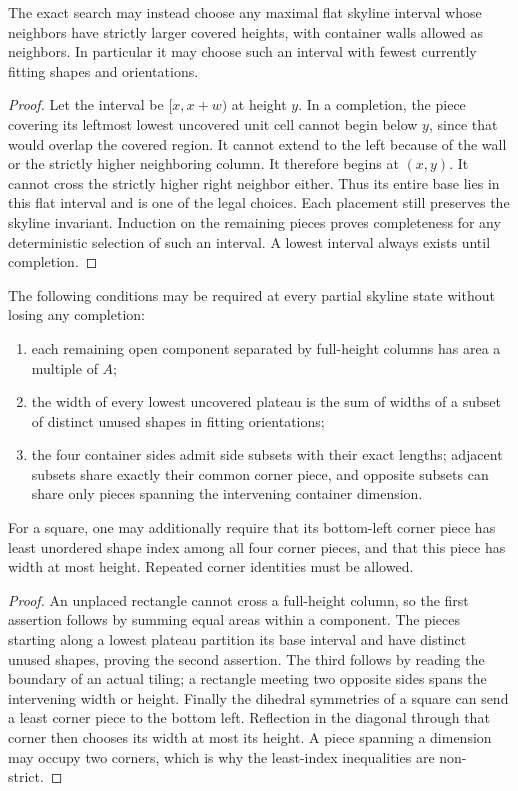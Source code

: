 \documentclass[11pt]{article}
\begin{document}
\begin{lemma}\label{valley}
The exact search may instead choose any maximal flat skyline interval whose
neighbors have strictly larger covered heights, with container walls allowed
as neighbors. In particular it may choose such an interval with fewest
currently fitting shapes and orientations.
\end{lemma}
\begin{proof}
Let the interval be $[x,x+w)$ at height $y$. In a completion, the piece
covering its leftmost lowest uncovered unit cell cannot begin below $y$,
since that would overlap the covered region. It cannot extend to the left
because of the wall or the strictly higher neighboring column. It therefore
begins at $(x,y)$. It cannot cross the strictly higher right neighbor either.
Thus its entire base lies in this flat interval and is one of the legal
choices. Each placement still preserves the skyline invariant. Induction on
the remaining pieces proves completeness for any deterministic selection of
such an interval. A lowest interval always exists until completion.
\end{proof}

\begin{proposition}\label{pruning}
The following conditions may be required at every partial skyline state without
losing any completion:
\begin{enumerate}
\item each remaining open component separated by full-height columns has area
a multiple of $A$;
\item the width of every lowest uncovered plateau is the sum of widths of a
subset of distinct unused shapes in fitting orientations;
\item the four container sides admit side subsets with their exact lengths;
adjacent subsets share exactly their common corner piece, and opposite subsets
can share only pieces spanning the intervening container dimension.
\end{enumerate}
For a square, one may additionally require that its bottom-left corner piece
has least unordered shape index among all four corner pieces, and that this
piece has width at most height. Repeated corner identities must be allowed.
\end{proposition}
\begin{proof}
An unplaced rectangle cannot cross a full-height column, so the first assertion
follows by summing equal areas within a component. The pieces starting along a
lowest plateau partition its base interval and have distinct unused shapes,
proving the second assertion. The third follows by reading the boundary of an
actual tiling; a rectangle meeting two opposite sides spans the intervening
width or height. Finally the dihedral symmetries of a square can send a least
corner piece to the bottom left. Reflection in the diagonal through that corner
then chooses its width at most its height. A piece spanning a dimension may
occupy two corners, which is why the least-index inequalities are non-strict.
\end{proof}
\end{document}
